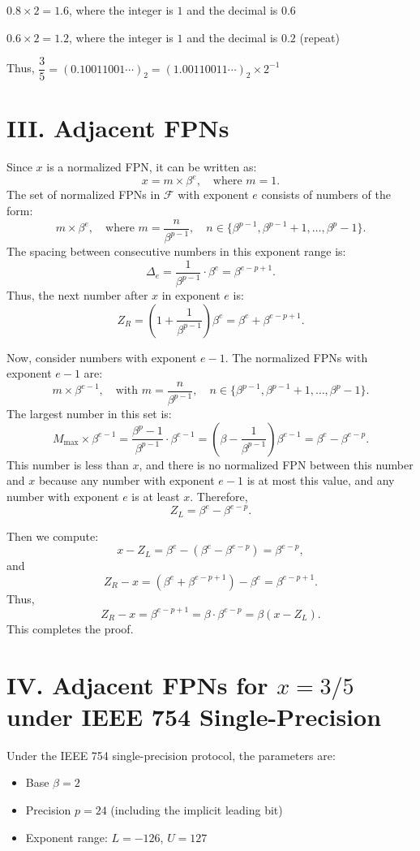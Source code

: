 \documentclass[a4paper]{article}
\begin{document}
$0.8 \times 2 = 1.6$, where the integer is $1$ and the decimal is $0.6$

$0.6 \times 2 = 1.2$, where the integer is $1$ and the decimal is $0.2$ (repeat)

Thus, $\dfrac{3}{5} = (0.10011001\cdots)_2 = (1.00110011\cdots)_2 \times 2^{-1}$

\section*{III. Adjacent FPNs}

Since \( x \) is a normalized FPN, it can be written as:
\[
x = m \times \beta ^e, \quad \text{where } m = 1.
\]
The set of normalized FPNs in \( \mathcal F \) with exponent \( e \) consists of numbers of the form:
\[
m \times \beta^e, \quad \text{where } m = \frac{n}{\beta^{p-1}}, \quad n \in \{\beta^{p-1}, \beta^{p-1}+1, \dots, \beta^p - 1\}.
\]
The spacing between consecutive numbers in this exponent range is:
\[
\Delta_e = \frac{1}{\beta^{p-1}} \cdot \beta^e = \beta^{e-p+1}.
\]
Thus, the next number after \( x \) in exponent \( e \) is:
\[
Z_R = \left(1 + \frac{1}{\beta^{p-1}}\right) \beta^e = \beta^e + \beta^{e-p+1}.
\]

Now, consider numbers with exponent \( e-1 \). The normalized FPNs with exponent \( e-1 \) are:
\[
m \times \beta^{e-1}, \quad \text{with } m = \frac{n}{\beta^{p-1}}, \quad n \in \{\beta^{p-1}, \beta^{p-1}+1, \dots, \beta^p - 1\}.
\]
The largest number in this set is:
\[
M_{\text{max}} \times \beta^{e-1} = \frac{\beta^p - 1}{\beta^{p-1}} \cdot \beta^{e-1} = \left(\beta - \frac{1}{\beta^{p-1}}\right) \beta^{e-1} = \beta^e - \beta^{e-p}.
\]
This number is less than \( x \), and there is no normalized FPN between this number and \( x \) because any number with exponent \( e-1 \) is at most this value, and any number with exponent \( e \) is at least \( x \). Therefore,
\[
Z_L = \beta^e - \beta^{e-p}.
\]

Then we compute:
\[
x - Z_L = \beta^e - (\beta^e - \beta^{e-p}) = \beta^{e-p},
\]
and
\[
Z_R - x = (\beta^e + \beta^{e-p+1}) - \beta^e = \beta^{e-p+1}.
\]
Thus,
\[
Z_R - x = \beta^{e-p+1} = \beta \cdot \beta^{e-p} = \beta (x - Z_L).
\]
This completes the proof.


\section*{IV. Adjacent FPNs for \( x = 3/5 \) under IEEE 754 Single-Precision}

Under the IEEE 754 single-precision protocol, the parameters are:
\begin{itemize}
\item Base \(\beta = 2\)
\item Precision \(p = 24\) (including the implicit leading bit)
\item Exponent range: \(L = -126\), \(U = 127\)
\end{itemize}
\end{document}
